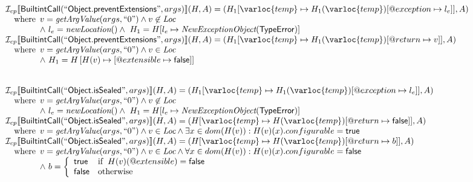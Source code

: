 \[
\begin{array}{l}

\I _{cp}\lbr \SF{BuiltintCall}(``\SF{Object.preventExtensions}",args)\rbr(H,A)
 = (H_1[\varloc{temp}\mapsto H_1(\varloc{temp})[\varprop{exception}\mapsto l_{e}]], A) \\
\quad\wherec{
  v = \hf{getArgValue}(args, ``0") \land v\not\in\Loc\\
  \land\ l_e = \hf{newLocation}() \land\ H_1=H[l_e\mapsto\hf{NewExceptionObject}(\SF{TypeError})] }\\
  
\I _{cp}\lbr \SF{BuiltintCall}(``\SF{Object.preventExtensions}",args)\rbr(H,A)
 = (H_1[\varloc{temp}\mapsto H_1(\varloc{temp})[\varprop{return}\mapsto v]], A) \\
\quad\wherec{
  v = \hf{getArgValue}(args, ``0") \land v  \in\Loc\\
  \land\ H_1 = H\left[H(v) \mapsto [\varprop{extensible} \mapsto \SF{false}]\right]\\
   }\\
\\\\


\I _{cp}\lbr \SF{BuiltintCall}(``\SF{Object.isSealed}",args)\rbr(H,A)
 = (H_1[\varloc{temp}\mapsto H_1(\varloc{temp})[\varprop{exception}\mapsto l_{e}]], A) \\
\quad\wherec{
  v = \hf{getArgValue}(args, ``0") \land v\not\in\Loc\\
  \land\ l_e = \hf{newLocation}() \land\ H_1=H[l_e\mapsto\hf{NewExceptionObject}(\SF{TypeError})] }\\
  
\I _{cp}\lbr \SF{BuiltintCall}(``\SF{Object.isSealed}",args)\rbr(H,A)
 = (H[\varloc{temp}\mapsto H(\varloc{temp})[\varprop{return}\mapsto \SF{false}]], A) \\
\quad\wherec{
  v = \hf{getArgValue}(args, ``0") \land v  \in\Loc
  \land \exists x \in dom(H(v)) : H(v)(x).configurable = \SF{true}
  }\\
   
\I _{cp}\lbr \SF{BuiltintCall}(``\SF{Object.isSealed}",args)\rbr(H,A)
 = (H[\varloc{temp}\mapsto H(\varloc{temp})[\varprop{return}\mapsto b]], A) \\
\quad\wherec{
  v = \hf{getArgValue}(args, ``0") \land v  \in\Loc
  \land \forall x \in dom(H(v)) : H(v)(x).configurable = \SF{false}\\
  \land\ b = \left\{
    \begin{array}{ll}
      \SF{true} & \ifc{H(v)(@extensible) = \SF{false}}\\
      \SF{false} & \owc
    \end{array}\right.
   }\\
\\\\


\end{array}\]
